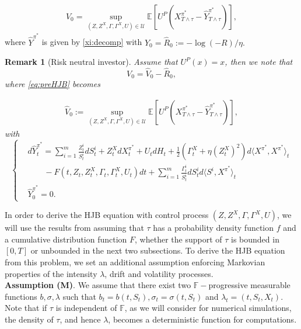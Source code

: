 \documentclass[11pt,a4paper]{article}
\theoremstyle{thmstyleone}%
\theoremstyle{thmstyletwo}%
\newtheorem{remark}{Remark}%
\theoremstyle{thmstylethree}%
\newcommand{\F}{\mathbb{F}}
\newcommand{\T}{T \wedge \tau}
\begin{document}
  \begin{align} \label{eq:preHJB}
    V_0= \sup_{(Z, Z^X, \Gamma, \Gamma^X, U)\in \mathcal U} \mathbb{E}[U^P(X_{\T}^{\pi^*} -\hat Y^{\pi^*}_{\T})],
\end{align}
where 
$\hat Y^{\pi^*}$ is given by \eqref{xi:decomp} with $Y_0=\hat R_0:=-\log(-R)/\eta.$

\begin{remark}[Risk neutral investor]
    Assume that $U^P(x)=x$, then we note that 
    \[
    V_0= \hat V_0 - \hat R_0,
 \]
 where \eqref{eq:preHJB} becomes

     \begin{align*}\hat V_0:=\sup_{(Z, Z^X, \Gamma, \Gamma^X, U)\in \mathcal U} \mathbb{E}[U^P(X_{\T}^{\pi^*} -\hat Y^{\pi^*}_{\T})],
\end{align*}
with 
\[
\begin{cases}
     &d\hat Y^{\pi^*}_t= \sum_{i=1}^m \frac{Z^i_t}{S^i_t} dS^i_t +  Z_t^X dX^{\pi^*}_t +  U_t dH_t+ \frac{1}{2} (\Gamma_t^X + \eta (Z_t^X)^2 ) d\langle X^{\pi^*}, X^{\pi^*}\rangle_t\\
     &\qquad - F(t, Z_t, Z_t^X, \Gamma_t, \Gamma_t^X,U_t) dt+\sum_{i=1}^m \frac{\Gamma^i_t}{S^i_t} dS^i_t d\langle S^i, X^{\pi^*}\rangle_t\\
     &\hat Y_0^{\pi^*}=0.
     \end{cases}\]
\end{remark}
In order to derive the HJB equation with control process $(Z, Z^X, \Gamma, \Gamma^X, U)$, we will use the results from \cite{blanchet2008optimal} assuming that $\tau$ has a probability density function $f$ and a cumulative distribution function $F$, whether the support of $\tau$ is bounded in $[0,T]$ or unbounded in the next two subsections. To derive the HJB equation from this problem, we set an additional assumption enforcing Markovian properties of the intensity $\lambda$, drift and volatility processes.\\

\noindent \textbf{Assumption (M)}. We assume that there exist two $\F-$progressive measurable functions $b,\sigma,\lambda$ such that $b_t=b(t,S_t),\sigma_t=\sigma(t,S_t)$ and $\lambda_t=(t,S_t,X_t)$.\\

Note that if $\tau$ is independent of $\mathbb F$, as we will consider for numerical simulations, the density of $\tau$, and hence $\lambda$, becomes a deterministic function for computations.\\
\end{document}
